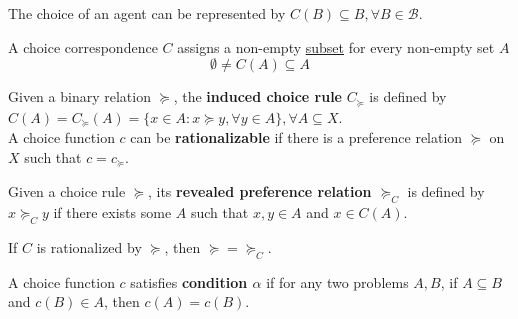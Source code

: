 \documentclass[11pt]{elegantbook}
\begin{document}
The choice of an agent can be represented by $C(B)\subseteq B, \forall B\in \mathcal{B}$.

\begin{definition}
    \normalfont
    A choice correspondence $C$ assigns a non-empty \underline{subset} for every non-empty set $A$
    $$\emptyset\neq C(A)\subseteq A$$
\end{definition}

\begin{definition}
    \normalfont
    Given a binary relation $\succeq$, the \textbf{induced choice rule} $C_\succeq$ is defined by
    $C(A)=C_\succeq(A)=\{x\in A:x\succeq y, \forall y\in A\}, \forall A\subseteq X$.\\
    A choice function $c$ can be \textbf{rationalizable} if there is a preference relation $\succeq$ on $X$ such that $c=c_\succeq$.
\end{definition}

\begin{definition}
    \normalfont
    Given a choice rule $\succeq$, its \textbf{revealed preference relation $\succeq_C$} is defined by $x \succeq_C y$ if there exists some $A$ such that $x, y \in A$ and $x \in C(A)$.
\end{definition}

\begin{proposition}
    If $C$ is rationalized by $\succeq$, then $\succeq=\succeq_C$.
\end{proposition}

\begin{definition}
    \normalfont
    A choice function $c$ satisfies \textbf{condition $\alpha$} if for any two problems $A,B$, if $A\subseteq B$ and $c(B)\in A$, then $c(A)=c(B)$.
\end{definition}
\end{document}
